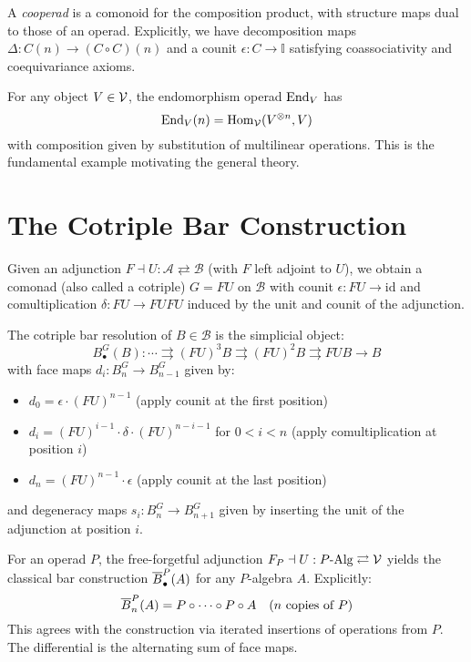 \begin{definition}[Cooperad]
A \emph{cooperad} is a comonoid for the composition product, with structure maps dual to those of an operad. Explicitly, we have decomposition maps $\Delta : C(n) \to (C \circ C)(n)$ and a counit $\epsilon : C \to \mathbb{I}$ satisfying coassociativity and coequivariance axioms.
\end{definition}
 
\begin{example}
For any object $V \in \mathcal{V}$, the endomorphism operad $\operatorname{End}_V$ has 
\[
\operatorname{End}_V(n) = \operatorname{Hom}_{\mathcal{V}}(V^{\otimes n}, V)
\]
with composition given by substitution of multilinear operations. This is the fundamental example motivating the general theory.
\end{example}
 
\section{The Cotriple Bar Construction}
 
Given an adjunction $F \dashv U : \mathcal{A} \rightleftarrows \mathcal{B}$ (with $F$ left adjoint to $U$), we obtain a comonad (also called a cotriple) $G = FU$ on $\mathcal{B}$ with counit $\epsilon : FU \to \text{id}$ and comultiplication $\delta : FU \to FUFU$ induced by the unit and counit of the adjunction.
 
\begin{definition}
The cotriple bar resolution of $B \in \mathcal{B}$ is the simplicial object:
\[
B^G_\bullet(B) : \cdots \rightrightarrows (FU)^3B \rightrightarrows (FU)^2B \rightrightarrows FUB \to B
\]
with face maps $d_i : B^G_n \to B^G_{n-1}$ given by:
\begin{itemize}
\item $d_0 = \epsilon \cdot (FU)^{n-1}$ (apply counit at the first position)
\item $d_i = (FU)^{i-1} \cdot \delta \cdot (FU)^{n-i-1}$ for $0 < i < n$ (apply comultiplication at position $i$)  
\item $d_n = (FU)^{n-1} \cdot \epsilon$ (apply counit at the last position)
\end{itemize}
and degeneracy maps $s_i : B^G_n \to B^G_{n+1}$ given by inserting the unit of the adjunction at position $i$.
\end{definition}
 
\begin{example}
For an operad $P$, the free-forgetful adjunction $F_P \dashv U : P\text{-Alg} \rightleftarrows \mathcal{V}$ yields the classical bar construction $\overline{B}^P_\bullet(A)$ for any $P$-algebra $A$. Explicitly:
\[
\overline{B}^P_n(A) = P \circ \cdots \circ P \circ A \quad \text{($n$ copies of $P$)}
\]
This agrees with the construction via iterated insertions of operations from $P$. The differential is the alternating sum of face maps.
\end{example}
 
